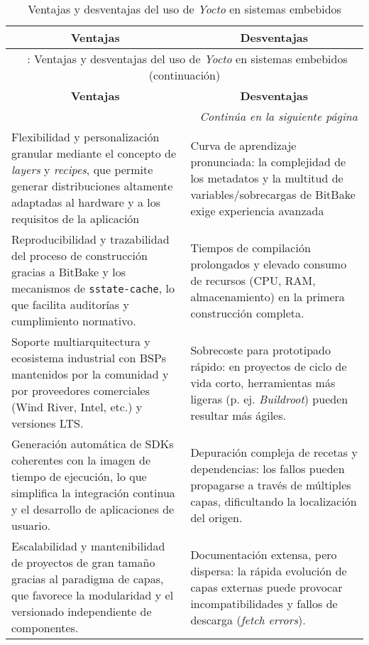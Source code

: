 \begin{longtable}{p{7.5cm}|p{7.5cm}}
    \caption{Ventajas y desventajas del uso de \textit{Yocto} en sistemas embebidos} \label{tab:yocto_pros_cons} \\
    \hline
    \multicolumn{1}{c|}{\textbf{Ventajas}} & \multicolumn{1}{c}{\textbf{Desventajas}} \\
    \hline
    \endfirsthead
    
    \multicolumn{2}{c}{\tablename\ \thetable{}: Ventajas y desventajas del uso de \textit{Yocto} en sistemas embebidos (continuación)} \\
    \hline
    \multicolumn{1}{c|}{\textbf{Ventajas}} & \multicolumn{1}{c}{\textbf{Desventajas}} \\
    \hline
    \endhead
    
    \hline
    \multicolumn{2}{r}{\textit{Continúa en la siguiente página}} \\
    \endfoot
    
    \hline
    \endlastfoot
    
    Flexibilidad y personalización granular mediante el concepto de \textit{layers} y \textit{recipes}, que permite generar distribuciones altamente adaptadas al hardware y a los requisitos de la aplicación & Curva de aprendizaje pronunciada: la complejidad de los metadatos y la multitud de variables/sobrecargas de BitBake exige experiencia avanzada \\ 
    \hline
    
    Reproducibilidad y trazabilidad del proceso de construcción gracias a BitBake y los mecanismos de \texttt{sstate‑cache}, lo que facilita auditorías y cumplimiento normativo. & Tiempos de compilación prolongados y elevado consumo de recursos (CPU, RAM, almacenamiento) en la primera construcción completa. \\
    \hline

    Soporte multiarquitectura y ecosistema industrial con BSPs mantenidos por la comunidad y por proveedores comerciales (Wind River, Intel, etc.) y versiones LTS. & Sobrecoste para prototipado rápido: en proyectos de ciclo de vida corto, herramientas más ligeras (p. ej. \textit{Buildroot}) pueden resultar más ágiles.\\
    \hline

    Generación automática de SDKs coherentes con la imagen de tiempo de ejecución, lo que simplifica la integración continua y el desarrollo de aplicaciones de usuario. & Depuración compleja de recetas y dependencias: los fallos pueden propagarse a través de múltiples capas, dificultando la localización del origen.\\
    \hline

    Escalabilidad y mantenibilidad de proyectos de gran tamaño gracias al paradigma de capas, que favorece la modularidad y el versionado independiente de componentes. & Documentación extensa, pero dispersa: la rápida evolución de capas externas puede provocar incompatibilidades y fallos de descarga (\textit{fetch errors}).
\end{longtable}

